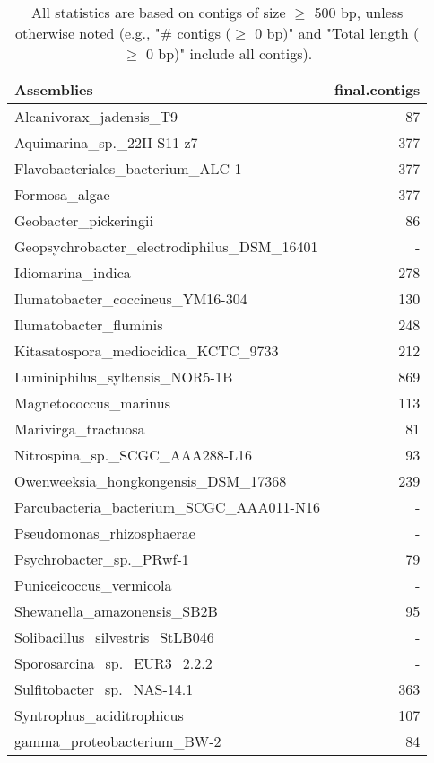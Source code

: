 \documentclass[12pt,a4paper]{article}
\begin{document}
\begin{table}[ht]
\begin{center}
\caption{All statistics are based on contigs of size $\geq$ 500 bp, unless otherwise noted (e.g., "\# contigs ($\geq$ 0 bp)" and "Total length ($\geq$ 0 bp)" include all contigs).}
\begin{tabular}{|l*{1}{|r}|}
\hline
Assemblies & final.contigs \\ \hline
Alcanivorax\_jadensis\_T9 & 87 \\ \hline
Aquimarina\_sp.\_22II-S11-z7 & 377 \\ \hline
Flavobacteriales\_bacterium\_ALC-1 & 377 \\ \hline
Formosa\_algae & 377 \\ \hline
Geobacter\_pickeringii & 86 \\ \hline
Geopsychrobacter\_electrodiphilus\_DSM\_16401 & - \\ \hline
Idiomarina\_indica & 278 \\ \hline
Ilumatobacter\_coccineus\_YM16-304 & 130 \\ \hline
Ilumatobacter\_fluminis & 248 \\ \hline
Kitasatospora\_mediocidica\_KCTC\_9733 & 212 \\ \hline
Luminiphilus\_syltensis\_NOR5-1B & 869 \\ \hline
Magnetococcus\_marinus & 113 \\ \hline
Marivirga\_tractuosa & 81 \\ \hline
Nitrospina\_sp.\_SCGC\_AAA288-L16 & 93 \\ \hline
Owenweeksia\_hongkongensis\_DSM\_17368 & 239 \\ \hline
Parcubacteria\_bacterium\_SCGC\_AAA011-N16 & - \\ \hline
Pseudomonas\_rhizosphaerae & - \\ \hline
Psychrobacter\_sp.\_PRwf-1 & 79 \\ \hline
Puniceicoccus\_vermicola & - \\ \hline
Shewanella\_amazonensis\_SB2B & 95 \\ \hline
Solibacillus\_silvestris\_StLB046 & - \\ \hline
Sporosarcina\_sp.\_EUR3\_2.2.2 & - \\ \hline
Sulfitobacter\_sp.\_NAS-14.1 & 363 \\ \hline
Syntrophus\_aciditrophicus & 107 \\ \hline
gamma\_proteobacterium\_BW-2 & 84 \\ \hline
\end{tabular}
\end{center}
\end{table}
\end{document}
